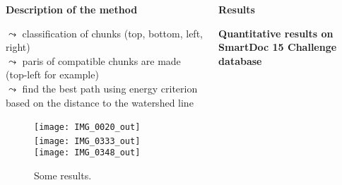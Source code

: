 \begin{columns}[t]
\begin{column}{0.49\textwidth}
\begin{block}{\bf Description of the method}
\begin{description}
\begin{itemize}
           $\leadsto$ classification of chunks (top, bottom, left, right) \\
           $\leadsto$ paris of compatible chunks are made (top-left for example)\\
           $\leadsto$ find the best path using energy criterion based on the distance to the watershed line
      \end{itemize}
        \end{description}
        \begin{figure}[t]
  \centering
  \texttt{[image: IMG\_0020\_out]}~
  \texttt{[image: IMG\_0333\_out]}~
  \texttt{[image: IMG\_0348\_out]}
  
  \caption*{Some results. \label{fig:results}}
  \vspace*{-.7em}
\end{figure}

      \end{block}
    \end{column}
    \begin{column}{0.49\textwidth}
      \begin{block}{\bf Results}
      \begin{description}
      
      \item[{\bf Quantitative results on SmartDoc 15 Challenge database}]
      

\end{description}
\end{block}
\end{column}
\end{columns}
